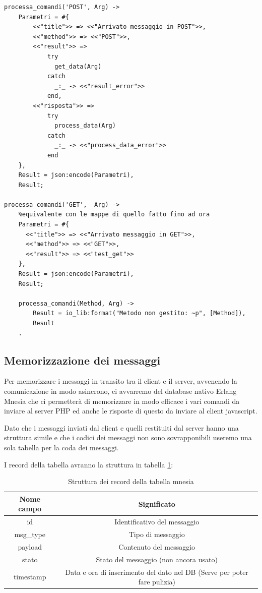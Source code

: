 \begin{verbatim}
processa_comandi('POST', Arg) ->
    Parametri = #{
        <<"title">> => <<"Arrivato messaggio in POST">>,
        <<"method">> => <<"POST">>,
        <<"result">> => 
            try 
              get_data(Arg)
            catch
              _:_ -> <<"result_error">>
            end,
        <<"risposta">> => 
            try 
              process_data(Arg)
            catch
              _:_ -> <<"process_data_error">>
            end
    },
    Result = json:encode(Parametri),
    Result;

processa_comandi('GET', _Arg) ->
    %equivalente con le mappe di quello fatto fino ad ora
    Parametri = #{
      <<"title">> => <<"Arrivato messaggio in GET">>,
      <<"method">> => <<"GET">>,
      <<"result">> => <<"test_get">>
    },
    Result = json:encode(Parametri),
    Result; 

    processa_comandi(Method, Arg) ->
        Result = io_lib:format("Metodo non gestito: ~p", [Method]),
        Result
    .
\end{verbatim}

\subsection{Memorizzazione dei messaggi}
Per memorizzare i messaggi in transito tra il client e il server, avvenendo la comunicazione in modo asincrono, ci avvarremo del database nativo Erlang Mnesia \cite{web:mnesia} che ci permetter\`a di memorizzare in modo efficace i vari comandi da inviare al server PHP ed anche le risposte di questo da inviare al client javascript.

Dato che i messaggi inviati dal client e quelli restituiti dal server hanno una struttura simile e che i codici dei messaggi non sono sovrapponibili useremo una sola tabella per la coda dei messaggi.

I record della tabella avranno la struttura in tabella \ref{tab:tabella_mnesia}:

\begin{table}[h]
	\centering %
	\caption{Struttura dei record della tabella mnesia}
	\begin{tabular}{|c|c|}
		\hline
		\textbf{Nome campo} & \textbf{Significato} \\
		\hline
		id & Identificativo del messaggio \\
		\hline
		msg\_type & Tipo di messaggio \\
		\hline
		payload & Contenuto del messaggio \\
		\hline
		stato & Stato del messaggio (non ancora usato) \\
		\hline
		timestamp & Data e ora di inserimento del dato nel DB (Serve per poter fare pulizia) \\
		\hline
	\end{tabular}
	\label{tab:tabella_mnesia}
\end{table}

